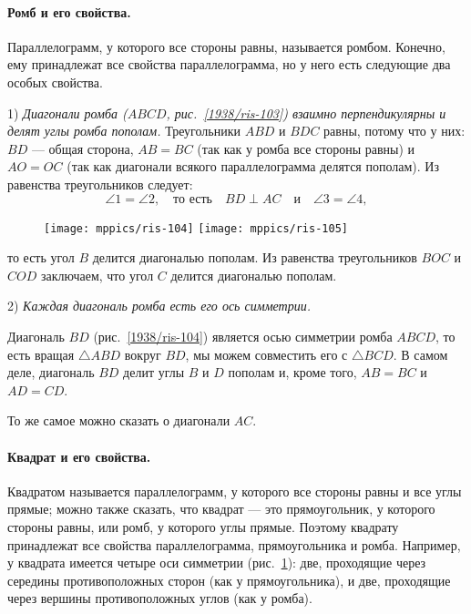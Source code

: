 \documentclass[twoside]{book}
\begin{document}
\paragraph{Ромб и его свойства.}\label{1938/93}
Параллелограмм, у которого все стороны равны, называется ромбом.
Конечно, ему принадлежат все свойства параллелограмма, но у него есть следующие два особых свойства.

1) \emph{Диагонали ромба \emph{($ABCD$, рис.~\ref{1938/ris-103})} взаимно перпендикулярны и делят углы ромба пополам.}
Треугольники $ABD$ и $BDC$ равны, потому что у них:
$BD$ — общая сторона, $AB=BC$ (так как у ромба все стороны равны) и $AO=OC$ (так как диагонали всякого параллелограмма делятся пополам).
Из равенства треугольников следует:
\[\angle 1 =\angle 2,
\quad
\text{то есть}
\quad
BD\perp AC
\quad
\text{и}
\quad
\angle 3 =\angle 4,
\]

\begin{figure}
\vskip-0mm
\centering
\texttt{[image: mppics/ris-104]}
\label{1938/ris-104}
\bigskip
\texttt{[image: mppics/ris-105]}
\caption{}\label{1938/ris-105}
\end{figure}

\noindent
то есть угол $B$ делится диагональю пополам.
Из равенства треугольников $BOC$ и $COD$ заключаем, что угол $C$ делится диагональю пополам.

2) \emph{Каждая диагональ ромба есть его ось симметрии.}


Диагональ $BD$ (рис.~\ref{1938/ris-104}) является осью симметрии ромба $ABCD$,
то есть вращая $\triangle ABD$ вокруг $BD$, мы можем совместить его с $\triangle BCD$.
В самом деле, диагональ $BD$ делит углы $B$ и $D$ пополам и, кроме того, $AB=BC$ и $AD=CD$.

То же самое можно сказать о диагонали $AC$.

\paragraph{Квадрат и его свойства.}\label{1938/94}
Квадратом называется параллелограмм, у которого все стороны равны и все углы прямые;
можно также сказать, что квадрат — это прямоугольник, у которого стороны равны, или ромб, у которого углы прямые.
Поэтому квадрату принадлежат все свойства параллелограмма, прямоугольника и ромба.
Например, у квадрата имеется четыре оси симметрии (рис.~\ref{1938/ris-105}):
две, проходящие через середины противоположных сторон (как у прямоугольника), и две, проходящие через вершины противоположных углов (как у ромба).
\end{document}
